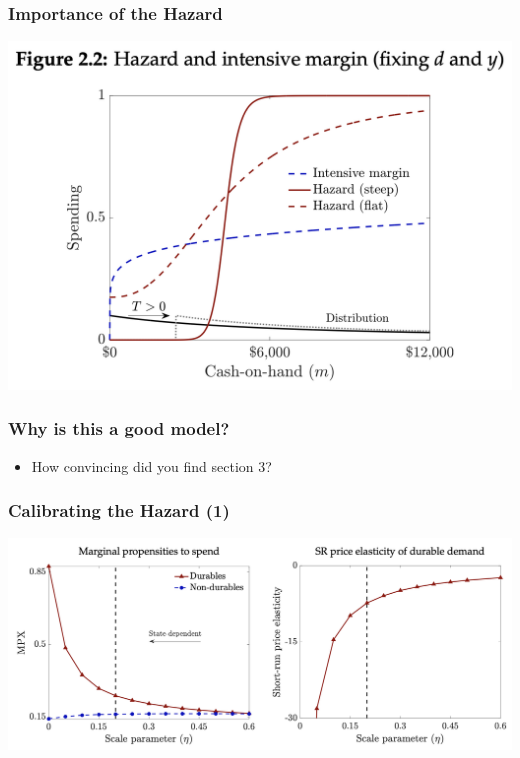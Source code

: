 \documentclass[english,xcolor=svgnames]{beamer}
\begin{document}
\begin{frame}
    \frametitle{Importance of the Hazard}
    \begin{center}
    	\includegraphics[scale=0.4]{figures/BZFIG22.png}	
    \end{center}
\end{frame}

\begin{frame}
    \frametitle{Why is this a good model?}
	\begin{itemize}
		\item How convincing did you find section 3?
	\end{itemize}
\end{frame}




\begin{frame}
    \frametitle{Calibrating the Hazard (1)}
    \begin{center}
    	\includegraphics[scale=0.3]{figures/BZFIG31.png}	
    \end{center}
\end{frame}
\end{document}
